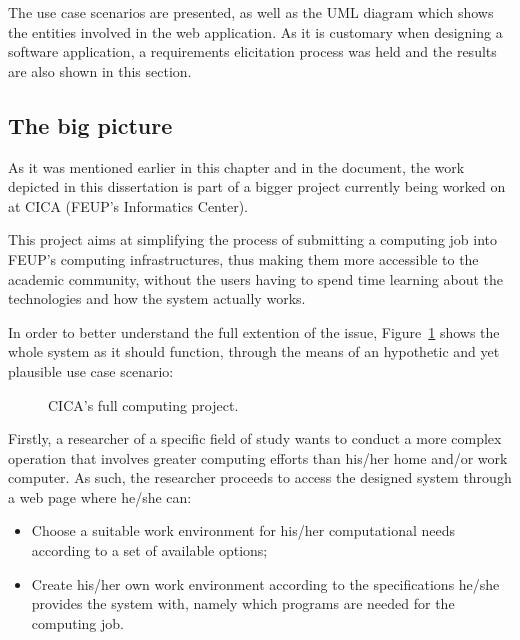 The use case scenarios are presented, as well as the UML diagram which shows the entities involved in the web application. As it is customary when designing a software application, a requirements elicitation process was held and the results are also shown in this section.

\subsection{The big picture}\label{subsec:bigpicture}

As it was mentioned earlier in this chapter and in the document, the work depicted in this dissertation is part of a bigger project currently being worked on at CICA (FEUP's Informatics Center).

This project aims at simplifying the process of submitting a computing job into FEUP's computing infrastructures, thus making them more accessible to the academic community, without the users having to spend time learning about the technologies and how the system actually works.

In order to better understand the full extention of the issue, Figure~\ref{fig:big_picture} shows the whole system as it should function, through the means of an hypothetic and yet plausible use case scenario:

\begin{figure}[h!]
  \begin{center}
    \leavevmode
    \caption{CICA's full computing project.}
    \label{fig:big_picture}
  \end{center}
\end{figure}

Firstly, a researcher of a specific field of study wants to conduct a more complex operation that involves greater computing efforts than his/her home and/or work computer. As such, the researcher proceeds to access the designed system through a web page where he/she can:

\begin{itemize}
	\item Choose a suitable work environment for his/her computational needs according to a set of available options;
	\item Create his/her own work environment according to the specifications he/she provides the system with, namely which programs are needed for the computing job.
\end{itemize}

